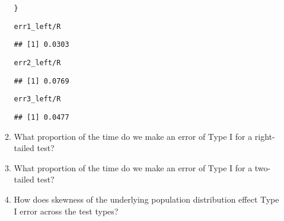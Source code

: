 \documentclass{article}\usepackage[]{graphicx}\usepackage[]{xcolor}
\makeatletter
\newcommand{\hlopt}[1]{\textcolor[rgb]{0,0,0}{#1}}%
\newcommand{\hldef}[1]{\textcolor[rgb]{0.345,0.345,0.345}{#1}}%
\newenvironment{kframe}{%
 \def\at@end@of@kframe{}%
 \ifinner\ifhmode%
  \def\at@end@of@kframe{\end{minipage}}%
  \begin{minipage}{\columnwidth}%
 \fi\fi%
 \def\FrameCommand##1{\hskip\@totalleftmargin \hskip-\fboxsep
 \colorbox{shadecolor}{##1}\hskip-\fboxsep
     \hskip-\linewidth \hskip-\@totalleftmargin \hskip\columnwidth}%
 \MakeFramed {\advance\hsize-\width
   \@totalleftmargin\z@ \linewidth\hsize
   \@setminipage}}%
 {\par\unskip\endMakeFramed%
 \at@end@of@kframe}
\newenvironment{knitrout}{}{} %
\makeatother
\begin{document}
\begin{enumerate}
\begin{enumerate}
\begin{knitrout}
\begin{kframe}
\begin{alltt}
\hldef{\}}

\hldef{err1_left}\hlopt{/}\hldef{R}
\end{alltt}
\begin{verbatim}
## [1] 0.0303
\end{verbatim}
\begin{alltt}
\hldef{err2_left}\hlopt{/}\hldef{R}
\end{alltt}
\begin{verbatim}
## [1] 0.0769
\end{verbatim}
\begin{alltt}
\hldef{err3_left}\hlopt{/}\hldef{R}
\end{alltt}
\begin{verbatim}
## [1] 0.0477
\end{verbatim}
\end{kframe}
\end{knitrout}

    \item What proportion of the time do we make an error of Type I for a
    right-tailed test?
    \item What proportion of the time do we make an error of Type I for a
    two-tailed test?
    \item How does skewness of the underlying population distribution effect
    Type I error across the test types?
  \end{enumerate}
\end{enumerate}

\end{document}
